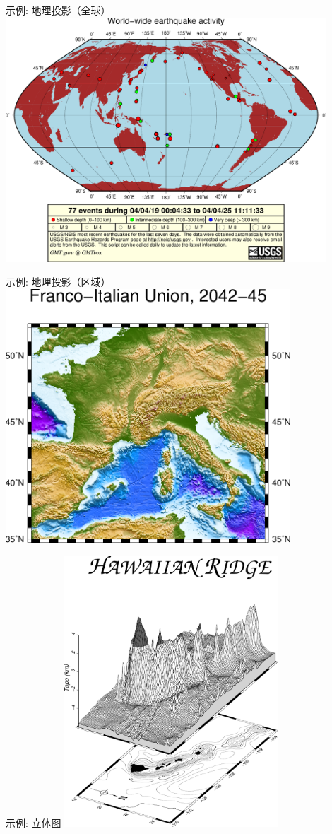 \documentclass[UTF8, 11pt]{ctexbeamer}
\begin{document}
\begin{frame}{示例: 地理投影（全球）}
\centering
\includegraphics[width=0.9\textwidth]{GMT_geo_global}
\end{frame}
\begin{frame}{示例: 地理投影（区域）}
\centering
\includegraphics[width=0.8\textwidth]{GMT_geo_regional}
\end{frame}
\begin{frame}{示例: 立体图}
\centering
\includegraphics[width=0.6\textwidth]{GMT_3D}
\end{frame}
\end{document}

